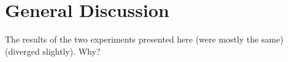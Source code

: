 
\section{General Discussion}

The results of the two experiments presented here (were mostly the same) (diverged slightly).  Why?

